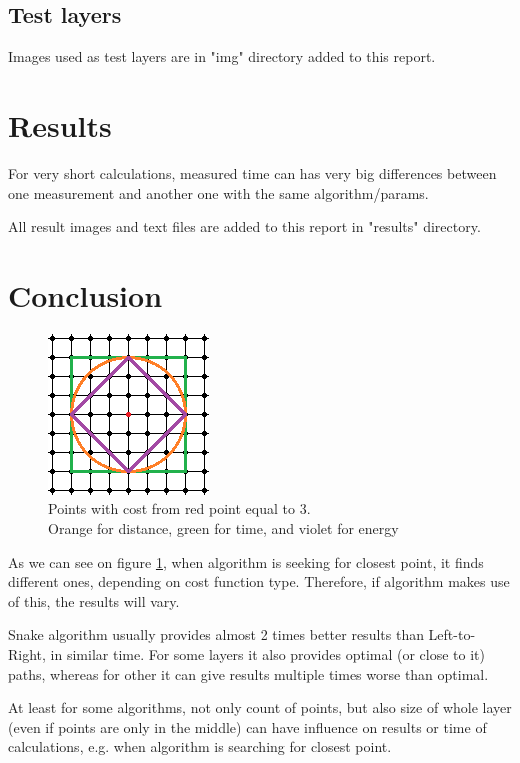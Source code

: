 \documentclass[titlepage]{article}
\begin{document}
\subsection{Test layers}
Images used as test layers are in "img" directory added to this report.

\section{Results}
For very short calculations, measured time can has very big differences between one measurement and another one with the same algorithm/params.

All result images and text files are added to this report in "results" directory.

\section{Conclusion}
\begin{figure}
\begin{center}
\includegraphics[scale=2]{img/costs}
\end{center}
\caption{Points with cost from red point equal to 3.\\Orange for distance, green for time, and violet for energy}
\label{cost_function_representation}
\end{figure}
As we can see on figure \ref{cost_function_representation}, when algorithm is seeking for closest point, it finds different ones, depending on cost function type. Therefore, if algorithm makes use of this, the results will vary.

Snake algorithm usually provides almost 2 times better results than Left-to-Right, in similar time. For some layers it also provides optimal (or close to it) paths, whereas for other it can give results multiple times worse than optimal.

At least for some algorithms, not only count of points, but also size of whole layer (even if points are only in the middle) can have influence on results or time of calculations, e.g. when algorithm is searching for closest point.
\end{document}
